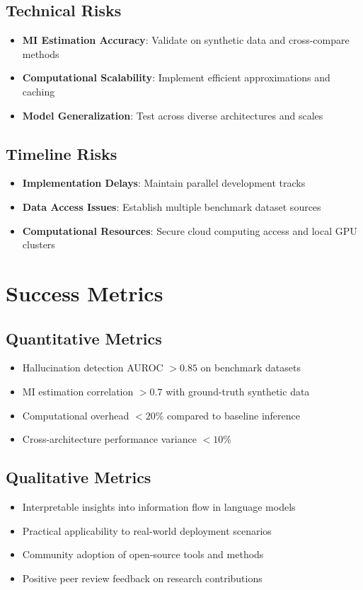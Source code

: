 \documentclass[11pt, oneside]{book}
\theoremstyle{plain}
\theoremstyle{definition}
\theoremstyle{remark}
\begin{document}
\subsection{Technical Risks}
\begin{itemize}
    \item \textbf{MI Estimation Accuracy}: Validate on synthetic data and cross-compare methods
    \item \textbf{Computational Scalability}: Implement efficient approximations and caching
    \item \textbf{Model Generalization}: Test across diverse architectures and scales
\end{itemize}

\subsection{Timeline Risks}
\begin{itemize}
    \item \textbf{Implementation Delays}: Maintain parallel development tracks
    \item \textbf{Data Access Issues}: Establish multiple benchmark dataset sources
    \item \textbf{Computational Resources}: Secure cloud computing access and local GPU clusters
\end{itemize}

\section{Success Metrics}

\subsection{Quantitative Metrics}
\begin{itemize}
    \item Hallucination detection AUROC $> 0.85$ on benchmark datasets
    \item MI estimation correlation $> 0.7$ with ground-truth synthetic data
    \item Computational overhead $< 20\%$ compared to baseline inference
    \item Cross-architecture performance variance $< 10\%$
\end{itemize}

\subsection{Qualitative Metrics}
\begin{itemize}
    \item Interpretable insights into information flow in language models
    \item Practical applicability to real-world deployment scenarios
    \item Community adoption of open-source tools and methods
    \item Positive peer review feedback on research contributions
\end{itemize}
\end{document}
